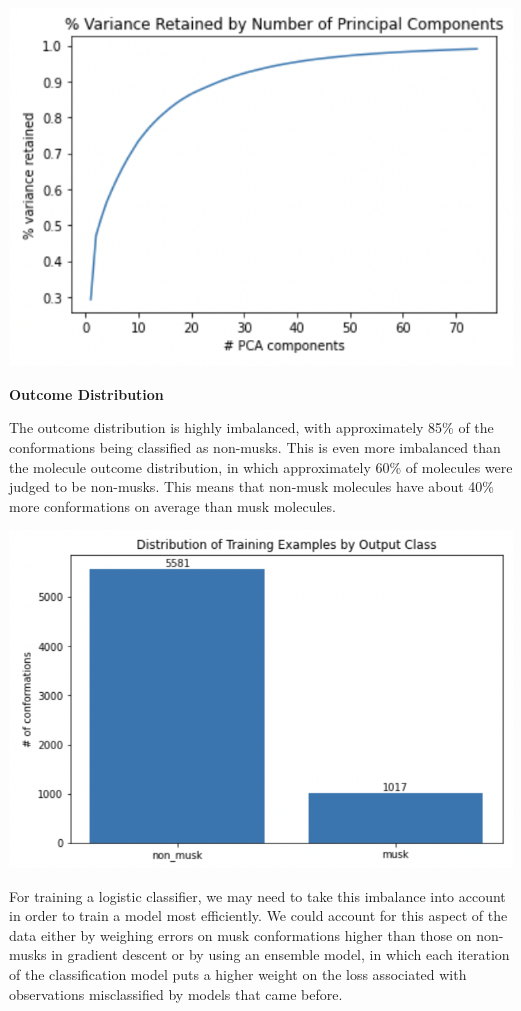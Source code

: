 \documentclass[12pt]{article}
\begin{document}
\includegraphics[scale=1.2]{pca_var_retained.jpg}

\textbf{Outcome Distribution}

The outcome distribution is highly imbalanced, with approximately 85\% of the conformations being classified as non-musks. This is even more imbalanced than the molecule outcome distribution, in which approximately 60\% of molecules were judged to be non-musks. This means that non-musk molecules have about 40\% more conformations on average than musk molecules.

\includegraphics[scale=1]{outcome_distrib.jpg}

For training a logistic classifier, we may need to take this imbalance into account in order to train a model most efficiently. We could account for this aspect of the data either by weighing errors on musk conformations higher than those on non-musks in gradient descent or by using an ensemble model, in which each iteration of the classification model puts a higher weight on the loss associated with observations misclassified by models that came before.
\end{document}
